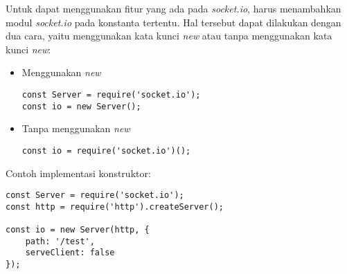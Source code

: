 \begin{enumerate}
\begin{itemize}
\begin{itemize}
\begin{itemize}
			\end{itemize}
		\end{itemize}
	
		Untuk dapat menggunakan fitur yang ada pada \textit{socket.io}, harus menambahkan modul \textit{socket.io} pada konstanta tertentu. Hal tersebut dapat dilakukan dengan dua cara, yaitu menggunakan kata kunci \textit{new} atau tanpa menggunakan kata kunci \textit{new}:
		
		\begin{itemize}
			\item Menggunakan \textit{new}
\begin{lstlisting}
const Server = require('socket.io');
const io = new Server();
\end{lstlisting}
			
			\item Tanpa menggunakan \textit{new}
\begin{lstlisting}
const io = require('socket.io')();
\end{lstlisting}
\end{itemize}
	
	Contoh implementasi konstruktor:
	
\begin{lstlisting}
const Server = require('socket.io');
const http = require('http').createServer();
		
const io = new Server(http, {
	path: '/test',
	serveClient: false
});
\end{lstlisting}
	
%	
	

\end{itemize}
\end{enumerate}
